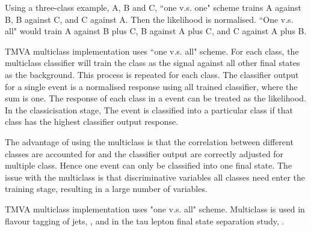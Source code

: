 Using a three-class example, A, B and C, ``one v.s. one" scheme trains A against B, B against C, and C against A. Then the likelihood is normalised. ``One v.s. all" would train A against B plus C, B against A plus C, and C against A plus B.

TMVA multiclass implementation uses ``one v.s. all" scheme. For each class, the multiclass classifier will train the class as the signal against all other final states as the background. This process is repeated for each class. The classifier output for a single event is a normalised response using all trained classifier, where the sum is one. The response of each class in a event can be treated as the likelihood. In the classicisation stage, The event is classified into a particular class if that class has the highest classifier output response.

The advantage of using the multiclass is that the correlation between different classes are accounted for and the classifier output are correctly adjusted for multiple class. Hence one event can only be classified into one final state. The issue with the multiclass is that discriminative variables all classes need enter the training stage, resulting in a large number of variables.

TMVA multiclass implementation uses "one v.s. all" scheme. Multiclass is used in flavour tagging of jets, , and in the tau lepton final state separation study, \Section{}.

